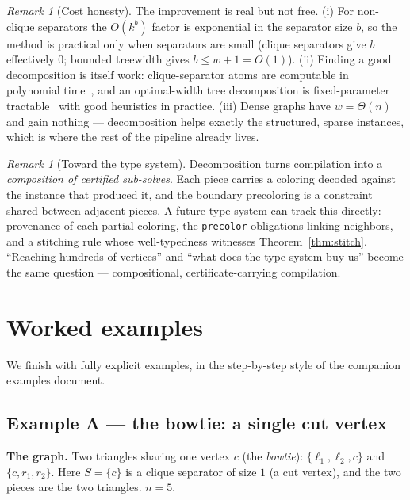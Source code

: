 \documentclass[11pt]{article}
\theoremstyle{definition}
\theoremstyle{remark}
\newtheorem{remark}[theorem]{Remark}
\begin{document}
\begin{remark}[Cost honesty]
The improvement is real but not free. (i) For non-clique separators the
$O(k^{b})$ factor is exponential in the separator size $b$, so the method is
practical only when separators are small (clique separators give $b$ effectively
$0$; bounded treewidth gives $b\le w+1=O(1)$). (ii) Finding a good decomposition is
itself work: clique-separator atoms are computable in polynomial
time~\cite{Tarjan1985}, and an optimal-width tree decomposition is fixed-parameter
tractable~\cite{Bodlaender1996} with good heuristics in practice. (iii) Dense
graphs have $w=\Theta(n)$ and gain nothing --- decomposition helps exactly the
structured, sparse instances, which is where the rest of the pipeline already
lives.
\end{remark}

\begin{remark}[Toward the type system]
Decomposition turns compilation into a \emph{composition of certified sub-solves}.
Each piece carries a coloring decoded against the instance that produced it, and
the boundary precoloring is a constraint shared between adjacent pieces. A future
type system can track this directly: provenance of each partial coloring, the
\texttt{precolor} obligations linking neighbors, and a stitching rule whose
well-typedness witnesses Theorem~\ref{thm:stitch}. ``Reaching hundreds of
vertices'' and ``what does the type system buy us'' become the same question ---
compositional, certificate-carrying compilation.
\end{remark}

\section{Worked examples}
\label{sec:examples}

We finish with fully explicit examples, in the step-by-step style of the
companion examples document.

\subsection{Example A --- the bowtie: a single cut vertex}

\textbf{The graph.} Two triangles sharing one vertex $c$ (the \emph{bowtie}):
$\{\ell_1,\ell_2,c\}$ and $\{c,r_1,r_2\}$. Here $S=\{c\}$ is a clique separator of
size $1$ (a cut vertex), and the two pieces are the two triangles. $n=5$.
\end{document}
